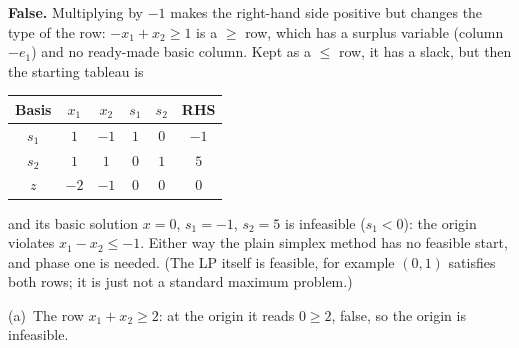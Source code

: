 \begin{solutions}
  \item \textbf{False.} Multiplying by $-1$ makes the right-hand side
        positive but changes the type of the row: $-x_1+x_2\ge 1$ is a
        $\ge$ row, which has a surplus variable (column $-e_1$) and no
        ready-made basic column. Kept as a $\le$ row, it has a slack, but
        then the starting tableau is
        \begin{center}
        \begin{tabular}{c|cccc|c}
        Basis & $x_1$ & $x_2$ & $s_1$ & $s_2$ & RHS\\
        \hline
        $s_1$ & $1$ & $-1$ & $1$ & $0$ & $-1$\\
        $s_2$ & $1$ & $1$ & $0$ & $1$ & $5$\\
        \hline
        $z$ & $-2$ & $-1$ & $0$ & $0$ & $0$\\
        \end{tabular}
        \end{center}
        and its basic solution $x=0$, $s_1=-1$, $s_2=5$ is infeasible
        ($s_1<0$): the origin violates $x_1-x_2\le -1$. Either way the
        plain simplex method has no feasible start, and phase one is
        needed. (The LP itself is feasible, for example $(0,1)$ satisfies
        both rows; it is just not a standard maximum problem.)

  \item (a)~The row $x_1+x_2\ge 2$: at the origin it reads $0\ge 2$,
        false, so the origin is infeasible.


\end{solutions}
